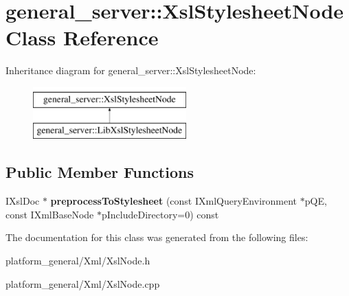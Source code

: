 \hypertarget{classgeneral__server_1_1XslStylesheetNode}{\section{general\-\_\-server\-:\-:\-Xsl\-Stylesheet\-Node \-Class \-Reference}
\label{classgeneral__server_1_1XslStylesheetNode}
}
\-Inheritance diagram for general\-\_\-server\-:\-:\-Xsl\-Stylesheet\-Node\-:\begin{figure}[H]
\begin{center}
\leavevmode
\includegraphics[height=2.000000cm]{classgeneral__server_1_1XslStylesheetNode}
\end{center}
\end{figure}
\subsection*{\-Public \-Member \-Functions}
\begin{DoxyCompactItemize}
\item 
\hypertarget{classgeneral__server_1_1XslStylesheetNode_a12f8e0ec99e0b687f989276dfb695cd9}{\-I\-Xsl\-Doc $\ast$ {\bfseries preprocess\-To\-Stylesheet} (const \-I\-Xml\-Query\-Environment $\ast$p\-Q\-E, const \-I\-Xml\-Base\-Node $\ast$p\-Include\-Directory=0) const }\label{classgeneral__server_1_1XslStylesheetNode_a12f8e0ec99e0b687f989276dfb695cd9}

\end{DoxyCompactItemize}


\-The documentation for this class was generated from the following files\-:\begin{DoxyCompactItemize}
\item 
platform\-\_\-general/\-Xml/\-Xsl\-Node.\-h\item 
platform\-\_\-general/\-Xml/\-Xsl\-Node.\-cpp\end{DoxyCompactItemize}
